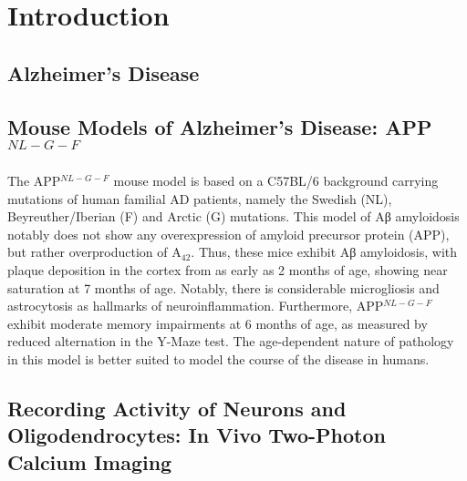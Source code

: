 \chapter{\label{ch:1-intro}Introduction} 

\minitoc

\section{Alzheimer's Disease}
\section{Mouse Models of Alzheimer’s Disease: APP$^{NL-G-F}$}
The APP$^{NL-G-F}$ mouse model is based on a C57BL/6 background carrying mutations of human familial AD patients, namely the Swedish (NL), Beyreuther/Iberian (F) and Arctic (G) mutations.
This model of Aβ amyloidosis notably does not show any overexpression of amyloid precursor protein (APP), but rather overproduction of A\textbeta$_{42}$. Thus, these mice exhibit Aβ amyloidosis, with plaque deposition in the cortex from as early as 2 months of age, showing near saturation at 7 months of age. Notably, there is considerable microgliosis and astrocytosis as hallmarks of neuroinflammation. Furthermore,  APP$^{NL-G-F}$ exhibit moderate memory impairments at 6 months of age, as measured by reduced alternation in the Y-Maze test. The age-dependent nature of pathology in this model is better suited to model the course of the disease in humans. \cite{Saito2014}
\section{Recording Activity of Neurons and Oligodendrocytes: In Vivo Two-Photon Calcium Imaging}
